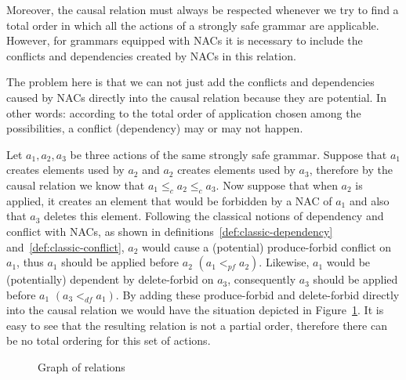 Moreover, the causal relation must always be respected whenever we try to find a total order in which all the actions of a strongly safe grammar are applicable. However, for grammars equipped with NACs it is necessary to include the conflicts and dependencies created by NACs in this relation.

The problem here is that we can not just add the conflicts and dependencies caused by NACs directly into the causal relation because they are potential. In other words: according to the total order of application chosen among the possibilities, a conflict (dependency) may or may not happen. 

\begin{example}
Let $a_1, a_2, a_3$ be three actions of the same strongly safe grammar. Suppose that $a_1$ creates elements used by $a_2$ and $a_2$ creates elements used by $a_3$, therefore by the causal relation we know that $a_1 \leq_c a_2 \leq_c a_3$. Now suppose that when $a_2$ is applied, it creates an element that would be forbidden by a NAC of $a_1$ and also that $a_3$ deletes this element. Following the classical notions of dependency and conflict with NACs, as shown in
  definitions~\ref{def:classic-dependency} and~\ref{def:classic-conflict}, $a_2$ would cause a (potential) produce-forbid conflict on $a_1$, thus $a_1$ should be applied before $a_2$ $(a_1 <_{pf} a_2)$. Likewise, $a_1$ would be (potentially) dependent by delete-forbid on $a_3$, consequently $a_3$ should be applied before $a_1$ $(a_3 <_{df} a_1)$. By adding these produce-forbid and delete-forbid directly into the causal relation we would have the situation depicted in Figure~\ref{fig:process:order:occurrence-relation-fail}. It is easy to see that the resulting relation is not a partial order, therefore there can be no total ordering for this set of actions.
\begin{figure}[!ht]
  \centering
  \caption{Graph of relations}\label{fig:process:order:occurrence-relation-fail}
\end{figure}


\end{example}
